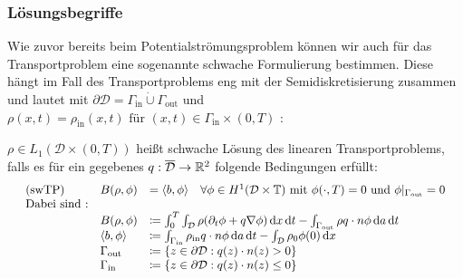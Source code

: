 \subsubsection{Lösungsbegriffe}
	Wie zuvor bereits beim Potentialströmungsproblem können wir auch für das Transportproblem eine sogenannte schwache Formulierung bestimmen. Diese hängt im Fall des Transportproblems eng mit der Semidiskretisierung zusammen und lautet mit $ \partial \mathcal{D} = \Gamma_{\text{in}} \dot{\cup} \Gamma_{\text{out}} $ und 
$\rho(x,t) = \rho_{\text{in}}(x,t) \text{ für } (x,t) \in \Gamma_{\text{in}} \times (0,T)$ :
\begin{Definition} 
	$ \rho \in L_1 (\mathcal{D} \times (0,T)) $ heißt schwache Lösung des linearen Transportproblems, falls es für ein gegebenes $ q : \overline{\mathcal{D}} \to \mathbb{R}^2 $ folgende Bedingungen erfüllt:
	\begin{align*}
	\begin{array}{rllll}
	&\text{(swTP)} \ &B(\rho,\phi) &= \langle b,\phi\rangle \quad \forall \phi \in H^1(\mathcal{D}\times\mathbb{T}) \text{ mit } \phi(\cdot,T) = 0 \text{ und } \phi|_{\Gamma_{\text{out}}} = 0 \\
	&\text{Dabei sind :} & & &\\
	& &B(\rho,\phi) &\coloneqq  \int_{0}^{T} \int_{\mathcal{D}} \rho (\partial_t \phi + q \nabla \phi ) \, \mathrm{d} x \, \mathrm{d} t - \int_{\Gamma_{\text{out}}} \rho q \cdot n \phi \, \mathrm{d} a  \, \mathrm{d} t \\
	& &\langle b,\phi \rangle &\coloneqq \int_{\Gamma_{\text{in}}} \rho_{\text{in}} q \cdot n \phi \, \mathrm{d} a  \, \mathrm{d} t - \int_{\mathcal{D}} \rho_0 \phi(0) \, \mathrm{d} x \\
	& & \Gamma_{\text{out}} &\coloneqq  \{ z \in \partial \mathcal{D}: q(z)\cdot n(z) > 0 \} & \\
	& & \Gamma_{\text{in}} &\coloneqq  \{ z \in \partial \mathcal{D}: q(z)\cdot n(z) \leq 0 \} &
	\end{array}\\
	\end{align*}
\end{Definition}
%	

